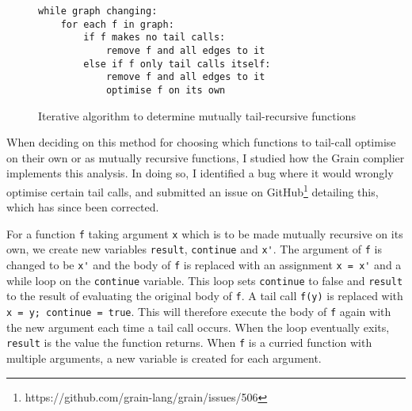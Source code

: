 \begin{figure}[H]
\centering
\begin{BVerbatim}
while graph changing:
    for each f in graph:
        if f makes no tail calls:
            remove f and all edges to it
        else if f only tail calls itself:
            remove f and all edges to it
            optimise f on its own
\end{BVerbatim}
\caption{Iterative algorithm to determine mutually tail-recursive functions}
\end{figure}


When deciding on this method for choosing which functions to tail-call optimise on their own or as mutually recursive functions, I studied how the Grain complier implements this analysis. In doing so, I identified a bug where it would wrongly optimise certain tail calls, and submitted an issue on GitHub\footnote{https://github.com/grain-lang/grain/issues/506} detailing this, which has since been corrected. %

For a function \verb|f| taking argument \verb|x| which is to be made mutually recursive on its own, we create new variables \verb|result|, \verb|continue| and \verb|x'|. The argument of \verb|f| is changed to be \verb|x'| and the body of \verb|f| is replaced with an assignment \verb|x = x'| and a while loop on the \verb|continue| variable. This loop sets \verb|continue| to false and \verb|result| to the result of evaluating the original body of \verb|f|. A tail call \verb|f(y)| is replaced with \verb|x = y; continue = true|. This will therefore execute the body of \verb|f| again with the new argument each time a tail call occurs. When the loop eventually exits, \verb|result| is the value the function returns. When \verb|f| is a curried function with multiple arguments, a new variable is created for each argument.

